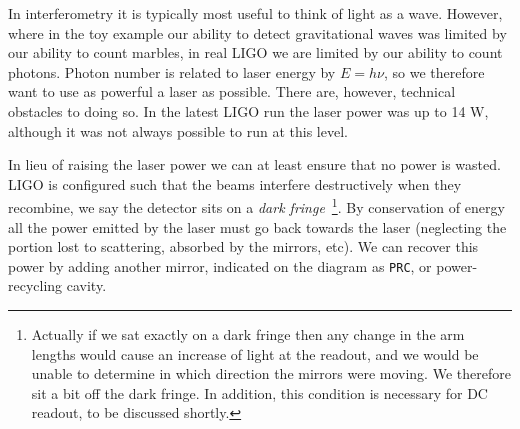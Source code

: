 In interferometry it is typically most useful to think of light as a
wave.  However, where in the toy example our ability to detect
gravitational waves was limited by our ability to count marbles, in
real LIGO we are limited by our ability to count photons.  Photon
number is related to laser energy by $E=h\nu$, so we therefore want to
use as powerful a laser as possible.  There are, however, technical
obstacles to doing so.  In the latest LIGO run the laser power was up
to 14 W, although it was not always possible to run at this level.

In lieu of raising the laser power we can at least ensure that no
power is wasted.  LIGO is configured such that the beams interfere
destructively when they recombine, we say the detector sits on a
\emph{dark fringe}~\footnote{Actually if we sat exactly on a dark
fringe then any change in the arm lengths would cause an increase of
light at the readout, and we would be unable to determine in which
direction the mirrors were moving.  We therefore sit a bit off the
dark fringe.  In addition, this condition is necessary for DC readout,
to be discussed shortly.}.  By conservation of energy all the power
emitted by the laser must go back towards the laser (neglecting the
portion lost to scattering, absorbed by the mirrors, etc).  We can
recover this power by adding another mirror, indicated on the diagram
as \texttt{PRC}, or power-recycling cavity.

